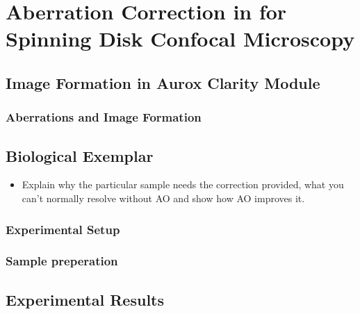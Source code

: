 \chapter{Aberration Correction in for Spinning Disk Confocal Microscopy}
\label{chpt:Aurox}

\section{Image Formation in Aurox Clarity Module}
\label{sec:Aurox_image_formation}

	\subsection{Aberrations and Image Formation}
	\label{subsec:Aurox_aberrations}

\section{Biological Exemplar}
\label{sec:Aurox_biology}

	\begin{itemize}
		\item Explain why the particular sample needs the correction provided, what you can't normally resolve without AO and show how  AO improves it.
	\end{itemize}

	\subsection{Experimental Setup}
	\label{subsec:Aurox_setup}

	\subsection{Sample preperation}
	\label{subsec:Aurox_sample_prep}
	
\section{Experimental Results}
\label{sec:Aurox_results}
